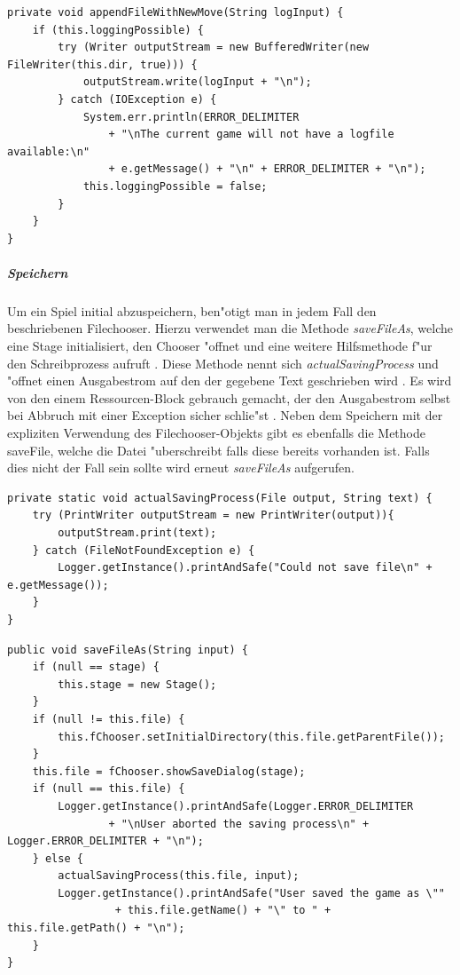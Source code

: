 \begin{lstlisting}[float,style=CodeHighlighting,caption=Logger - appendFileWithNewMove,label=lst:logger_appendFileWithNewMove]
private void appendFileWithNewMove(String logInput) {
    if (this.loggingPossible) {
        try (Writer outputStream = new BufferedWriter(new FileWriter(this.dir, true))) {
            outputStream.write(logInput + "\n");
        } catch (IOException e) {
            System.err.println(ERROR_DELIMITER 
            	+ "\nThe current game will not have a logfile available:\n"
                + e.getMessage() + "\n" + ERROR_DELIMITER + "\n");
            this.loggingPossible = false;
        }
    }
}
\end{lstlisting}

\subparagraph{Speichern}
Um ein Spiel initial abzuspeichern, ben"otigt man in jedem Fall den beschriebenen Filechooser. Hierzu verwendet man die Methode \emph{saveFileAs}, welche eine Stage initialisiert, den Chooser "offnet und eine weitere Hilfsmethode f"ur den Schreibprozess aufruft . Diese Methode nennt sich \emph{actualSavingProcess} und "offnet einen Ausgabestrom auf den der gegebene Text geschrieben wird . Es wird von den einem Ressourcen-Block gebrauch gemacht, der den Ausgabestrom selbst bei Abbruch mit einer Exception sicher schlie"st 
\cite{try-with-resources}. 
Neben dem Speichern mit der expliziten Verwendung des Filechooser-Objekts gibt es ebenfalls die Methode {saveFile}, welche die Datei "uberschreibt falls diese bereits vorhanden ist. Falls dies nicht der Fall sein sollte wird erneut \emph{saveFileAs} aufgerufen. 

\begin{lstlisting}[float,style=CodeHighlighting,caption=Loader - actualSavingProcess,label=lst:loader_actualSavingProcess]
private static void actualSavingProcess(File output, String text) {
    try (PrintWriter outputStream = new PrintWriter(output)){
        outputStream.print(text);
    } catch (FileNotFoundException e) {
        Logger.getInstance().printAndSafe("Could not save file\n" + e.getMessage());
    }
}
\end{lstlisting}

\begin{lstlisting}[float,style=CodeHighlighting,caption=Loader - saveFileAs,label=lst:loader_saveFileAs]
public void saveFileAs(String input) {
    if (null == stage) {
        this.stage = new Stage();
    }
    if (null != this.file) {
        this.fChooser.setInitialDirectory(this.file.getParentFile());
    }
    this.file = fChooser.showSaveDialog(stage);
    if (null == this.file) {
        Logger.getInstance().printAndSafe(Logger.ERROR_DELIMITER
                + "\nUser aborted the saving process\n" + Logger.ERROR_DELIMITER + "\n");
    } else {
        actualSavingProcess(this.file, input);
        Logger.getInstance().printAndSafe("User saved the game as \""
        		 + this.file.getName() + "\" to " + this.file.getPath() + "\n");
    }
}
\end{lstlisting}

